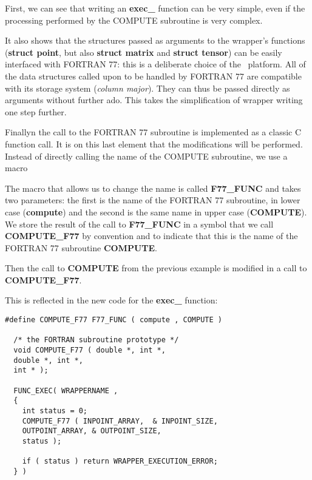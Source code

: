 First, we can see that writing an {\bf exec\_} function can be very simple, even if the processing performed by the COMPUTE subroutine is very complex.

It also shows that the structures passed as arguments to the wrapper's functions ({\bf struct point}, but also {\bf struct matrix} and {\bf struct tensor}) can be easily interfaced with FORTRAN 77: this is a deliberate choice of the \OT\ platform. All of the data structures called upon to be handled by FORTRAN 77 are compatible with its storage system (\emph{column major}). They can thus be passed directly as arguments without further ado. This takes the simplification of wrapper writing one step further.

Finallyn the call to the FORTRAN 77 subroutine is implemented as a classic C function call. It is on this last element that the modifications will be performed. Instead of directly calling the name of the COMPUTE subroutine, we use a macro%

The macro that allows us to change the name is called {\bf F77\_FUNC} and takes two parameters: the first is the name of the FORTRAN 77 subroutine, in lower case ({\bf compute}) and the second is the same name in upper case ({\bf COMPUTE}). We store the result of the call to {\bf F77\_FUNC} in a symbol that we call {\bf COMPUTE\_F77} by convention and to indicate that this is the name of the FORTRAN 77 subroutine {\bf COMPUTE}.

Then the call to {\bf COMPUTE} from the previous example is modified in a call to {\bf COMPUTE\_F77}.

This is reflected in the new code for the {\bf exec\_} function:

\lstset{language=C++, basicstyle=\normalsize}
\begin{lstlisting}[frame=TBRL]
  #define COMPUTE_F77 F77_FUNC ( compute , COMPUTE )

  /* the FORTRAN subroutine prototype */
  void COMPUTE_F77 ( double *, int *,
  double *, int *,
  int * );

  FUNC_EXEC( WRAPPERNAME ,
  {
    int status = 0;
    COMPUTE_F77 ( INPOINT_ARRAY,  & INPOINT_SIZE,
    OUTPOINT_ARRAY, & OUTPOINT_SIZE,
    status );

    if ( status ) return WRAPPER_EXECUTION_ERROR;
  } )
\end{lstlisting}

